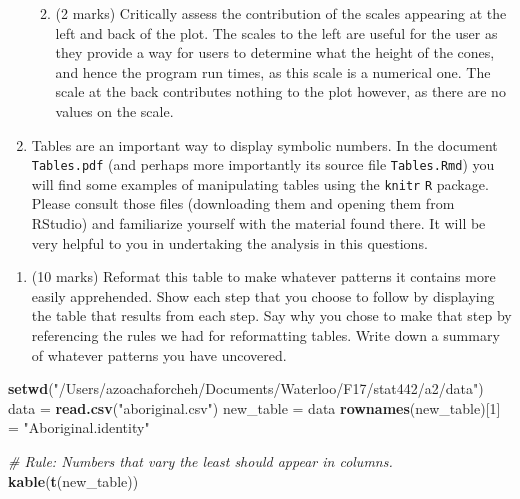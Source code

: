 \documentclass[9pt,letter]{article}
\newenvironment{Shaded}{\begin{snugshade}}{\end{snugshade}}
\newcommand{\KeywordTok}[1]{\textcolor[rgb]{0.13,0.29,0.53}{\textbf{#1}}}
\newcommand{\DecValTok}[1]{\textcolor[rgb]{0.00,0.00,0.81}{#1}}
\newcommand{\StringTok}[1]{\textcolor[rgb]{0.31,0.60,0.02}{#1}}
\newcommand{\CommentTok}[1]{\textcolor[rgb]{0.56,0.35,0.01}{\textit{#1}}}
\newcommand{\NormalTok}[1]{#1}
\providecommand{\tightlist}{%
  \setlength{\itemsep}{0pt}\setlength{\parskip}{0pt}}
\begin{document}
\begin{enumerate}
\begin{enumerate}
    \vspace{5mm}
  \item
    (2 marks) Critically assess the contribution of the scales appearing
    at the left and back of the plot. \newline
    \newline
    The scales to the left are useful for the user as they provide a way
    for users to determine what the height of the cones, and hence the
    program run times, as this scale is a numerical one. The scale at
    the back contributes nothing to the plot however, as there are no
    values on the scale.
  \end{enumerate}
\item
  Tables are an important way to display symbolic numbers. In the
  document \texttt{Tables.pdf} (and perhaps more importantly its source
  file \texttt{Tables.Rmd}) you will find some examples of manipulating
  tables using the \texttt{knitr} \texttt{R} package. Please consult
  those files (downloading them and opening them from RStudio) and
  familiarize yourself with the material found there. It will be very
  helpful to you in undertaking the analysis in this questions.
\end{enumerate}

\begin{enumerate}
\def\labelenumi{(\alph{enumi})}
\tightlist
\item
  (10 marks) Reformat this table to make whatever patterns it contains
  more easily apprehended. Show each step that you choose to follow by
  displaying the table that results from each step. Say why you chose to
  make that step by referencing the rules we had for reformatting
  tables. Write down a summary of whatever patterns you have uncovered.
\end{enumerate}

\begin{Shaded}
\begin{Highlighting}[]
\KeywordTok{setwd}\NormalTok{(}\StringTok{"/Users/azoachaforcheh/Documents/Waterloo/F17/stat442/a2/data"}\NormalTok{)}
\NormalTok{data =}\StringTok{ }\KeywordTok{read.csv}\NormalTok{(}\StringTok{"aboriginal.csv"}\NormalTok{)}
\NormalTok{new_table =}\StringTok{ }\NormalTok{data}
\KeywordTok{rownames}\NormalTok{(new_table)[}\DecValTok{1}\NormalTok{] =}\StringTok{ "Aboriginal.identity"}

\CommentTok{# Rule: Numbers that vary the least should appear in columns.}
\KeywordTok{kable}\NormalTok{(}\KeywordTok{t}\NormalTok{(new_table))}
\end{Highlighting}
\end{Shaded}
\end{document}
